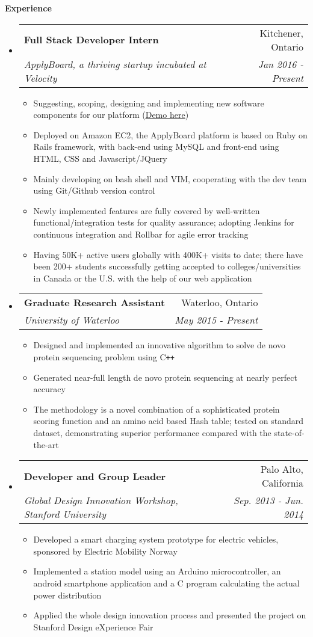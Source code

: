 \documentclass[letterpaper,10pt]{article}
\makeatletter
\newcommand{\resitem}[1]{\item #1 \vspace{-2pt}}
\newcommand{\resheading}[1]{{\large \colorbox{mygrey}{\begin{minipage}{\textwidth}{\textbf{#1 \vphantom{p\^{E}}}}\end{minipage}}}}
\newcommand{\ressubheading}[4]{
\begin{tabular*}{7.0in}{l@{\extracolsep{\fill}}r}
		\textbf{#1} & #2 \\
		\textit{#3} & \textit{#4} \\
\end{tabular*}\vspace{-6pt}}
\makeatother
\begin{document}
\resheading{Experience}
\begin{itemize}
\itemsep0em
\item 
    \ressubheading{Full Stack Developer Intern}{Kitchener, Ontario}{ApplyBoard, a thriving startup incubated at Velocity}{Jan 2016 - Present}
	\begin{itemize}
        \resitem{Suggesting, scoping, designing and implementing new software components for our platform (\href{https://www.applyboard.com/demo}{\underline{Demo here}})}
        \resitem{Deployed on Amazon EC2, the ApplyBoard platform is based on Ruby on Rails framework, with back-end using MySQL and front-end using HTML, CSS and Javascript/JQuery}
        \resitem{Mainly developing on bash shell and VIM, cooperating with the dev team using Git/Github version control}
		\resitem{Newly implemented features are fully covered by well-written functional/integration tests for quality assurance; adopting Jenkins for continuous integration and Rollbar for agile error tracking}
        \resitem{Having 50K+ active users globally with 400K+ visits to date; there have been 200+ students successfully getting accepted to colleges/universities in Canada or the U.S. with the help of our web application }
	\end{itemize}

\item
	\ressubheading{Graduate Research Assistant}{Waterloo, Ontario}{University of Waterloo}{May 2015 - Present}
	\begin{itemize}
		\resitem{Designed and implemented an innovative algorithm to solve de novo protein sequencing problem using C\texttt{++}}
		\resitem{Generated near-full length de novo protein sequencing at nearly perfect accuracy}
		\resitem{The methodology is a novel combination of a sophisticated protein scoring function and an amino acid based Hash table; tested on standard dataset, demonstrating superior performance compared with the state-of-the-art}
	\end{itemize}
\item
	\ressubheading{Developer and Group Leader}{Palo Alto, California}{Global Design Innovation Workshop, Stanford University}{ Sep. 2013 - Jun. 2014}
	\begin{itemize}
		\resitem{Developed a smart charging system prototype for electric vehicles, sponsored by Electric Mobility Norway}
        \resitem{Implemented a station model using an Arduino microcontroller, an android smartphone application and a C program calculating the actual power distribution}
		\resitem{Applied the whole design innovation process and presented the project on Stanford Design eXperience Fair}
	\end{itemize}
\end{itemize}
\end{document}
